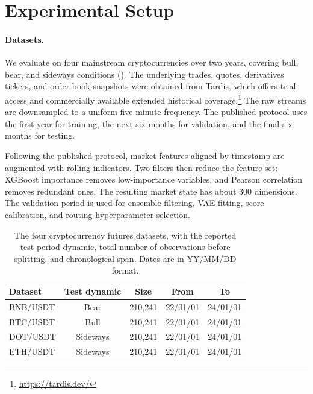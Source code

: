 \section{Experimental Setup}
\label{sec:fineft_setup}

\paragraph{Datasets.} We evaluate on four mainstream cryptocurrencies over two years, covering bull, bear, and sideways conditions (). The underlying trades, quotes, derivatives tickers, and order-book snapshots were obtained from Tardis, which offers trial access and commercially available extended historical coverage.\footnote{\url{https://tardis.dev/}} The raw streams are downsampled to a uniform five-minute frequency. The published protocol uses the first year for training, the next six months for validation, and the final six months for testing.

Following the published protocol, market features aligned by timestamp are augmented with rolling indicators. Two filters then reduce the feature set: XGBoost importance removes low-importance variables, and Pearson correlation removes redundant ones. The resulting market state has about 300 dimensions. The validation period is used for ensemble filtering, VAE fitting, score calibration, and routing-hyperparameter selection.

\begin{table}[!htb]
\setlength\tabcolsep{6pt}
\centering
\caption[FineFT dataset statistics.]{The four cryptocurrency futures datasets, with the reported test-period dynamic, total number of observations before splitting, and chronological span. Dates are in YY/MM/DD format.}
\label{tab:fineft_dataset}
\begin{tabular}{lcccc}
\toprule
\textbf{Dataset} & \textbf{Test dynamic} & \textbf{Size} & \textbf{From} & \textbf{To} \\
\midrule
BNB/USDT & Bear     & 210{,}241 & 22/01/01 & 24/01/01 \\
BTC/USDT & Bull     & 210{,}241 & 22/01/01 & 24/01/01 \\
DOT/USDT & Sideways & 210{,}241 & 22/01/01 & 24/01/01 \\
ETH/USDT & Sideways & 210{,}241 & 22/01/01 & 24/01/01 \\
\bottomrule
\end{tabular}
\end{table}

